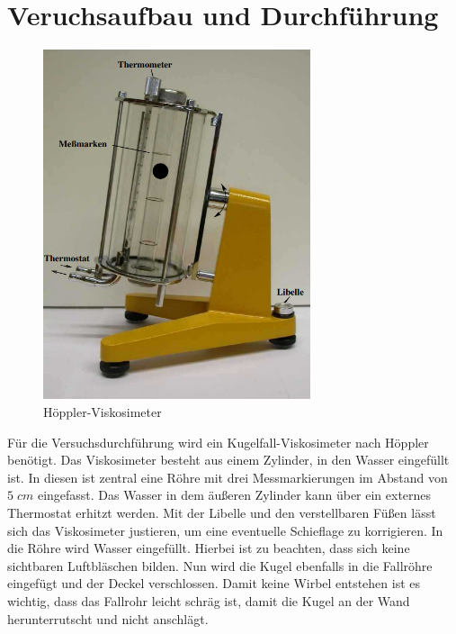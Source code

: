 \section{Veruchsaufbau und Durchführung}
\label{sec:Veruchsaufbau}

\begin{figure}[htbp]
    \centering
    \includegraphics[width=0.7\textwidth]{bilder/hoeppler_viskosimeter.png}
    \caption{Höppler-Viskosimeter}
    \label{fig:hoeppler}
\end{figure}

Für die Versuchsdurchführung wird ein Kugelfall-Viskosimeter nach Höppler benötigt. Das Viskosimeter besteht aus einem Zylinder, in den Wasser eingefüllt ist. 
In diesen ist zentral eine Röhre mit drei Messmarkierungen im Abstand von $5\;\unit{cm}$ eingefasst. 
Das Wasser in dem äußeren Zylinder kann über ein externes Thermostat erhitzt werden. Mit der Libelle und den verstellbaren Füßen lässt sich das Viskosimeter justieren, um
eine eventuelle Schieflage zu korrigieren. In die Röhre wird Wasser eingefüllt. Hierbei ist zu beachten, dass sich keine sichtbaren Luftbläschen bilden. Nun wird die Kugel ebenfalls in die Fallröhre eingefügt und 
der Deckel verschlossen.
Damit keine Wirbel entstehen ist es wichtig, dass das Fallrohr leicht schräg ist, damit die Kugel an der Wand herunterrutscht und nicht anschlägt.

